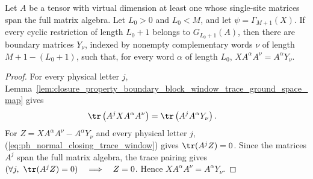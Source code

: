 \begin{lemma}
    \label{lem:closure_property_boundary_block_window_equation_ground_space_map_injective}
    \leanok
    Let $A$ be a tensor with virtual dimension at least one whose single-site
    matrices span the full matrix algebra. Let $L_0>0$ and $L_0<M$, and let
    $\psi=\Gamma_{M+1}(X)$. If every cyclic restriction of length $L_0+1$
    belongs to $G_{L_0+1}(A)$, then there are boundary matrices $Y_\nu$,
    indexed by nonempty complementary words $\nu$ of length
    $M+1-(L_0+1)$, such that, for every word $\alpha$ of length $L_0$,
    $X A^\alpha A^\nu = A^\alpha Y_\nu$.
\end{lemma}

\begin{proof}
    \leanok
    For every physical letter $j$,
    Lemma~\ref{lem:closure_property_boundary_block_window_trace_ground_space_map}
    gives
    \begin{align}
        \tr\left(A^jX A^\alpha A^\nu\right)
         & = \tr\left(A^jA^\alpha Y_\nu\right).
        \label{eq:ph_normal_closing_trace_window}
    \end{align}
    For $Z=X A^\alpha A^\nu-A^\alpha Y_\nu$ and every physical letter $j$,
    (\ref{eq:ph_normal_closing_trace_window}) gives $\tr(A^jZ)=0$.
    Since the matrices $A^j$ span the full matrix algebra, the trace pairing
    gives
    $(\forall j,\ \tr(A^jZ)=0) \quad\Longrightarrow\quad Z=0$.
    Hence $X A^\alpha A^\nu=A^\alpha Y_\nu$.
\end{proof}

